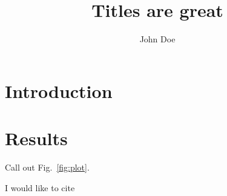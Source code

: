 \documentclass{article}
\author{John Doe}
\title{Titles are great}
\date{}
\begin{document}
\maketitle

\section{Introduction}



\section{Results}



Call out Fig.~\ref{fig:plot}.

I would like to cite \cite{}



\end{document}
